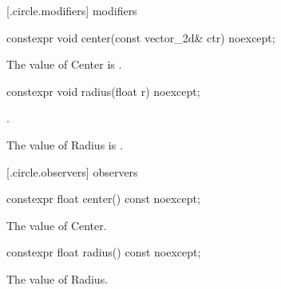  [\iotwod.circle.modifiers]{ modifiers}

%
\begin{itemdecl}
constexpr void center(const vector_2d& ctr) noexcept;
\end{itemdecl}

\begin{itemdescr}
\pnum
\effects
The value of Center is .
\end{itemdescr}

%
\begin{itemdecl}
constexpr void radius(float r) noexcept;
\end{itemdecl}
\begin{itemdescr}
\requires
{}.

\pnum
\effects
The value of Radius is .
\end{itemdescr}

 [\iotwod.circle.observers]{ observers}

%
\begin{itemdecl}
constexpr float center() const noexcept;
\end{itemdecl}
\begin{itemdescr}
\pnum
\returns
The value of Center.
\end{itemdescr}

%
\begin{itemdecl}
constexpr float radius() const noexcept;
\end{itemdecl}
\begin{itemdescr}
\pnum
\returns
The value of Radius.
\end{itemdescr}
